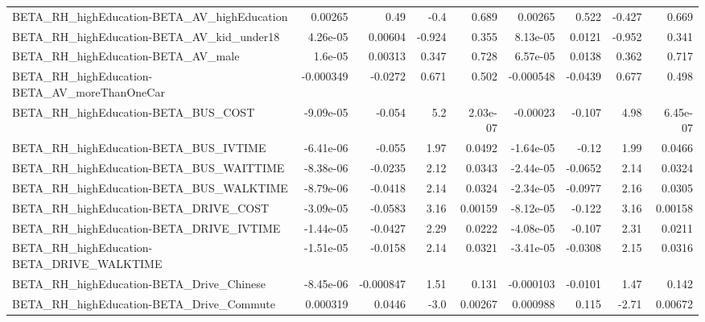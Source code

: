 \begin{tabular}{lrrrrrrrr}
BETA\_RH\_highEducation-BETA\_AV\_highEducation        &     0.00265 &         0.49 &     -0.4 &    0.689 &    0.00265 &       0.522 &       -0.427 &         0.669 \\
BETA\_RH\_highEducation-BETA\_AV\_kid\_under18          &    4.26e-05 &      0.00604 &   -0.924 &    0.355 &   8.13e-05 &      0.0121 &       -0.952 &         0.341 \\
BETA\_RH\_highEducation-BETA\_AV\_male                 &     1.6e-05 &      0.00313 &    0.347 &    0.728 &   6.57e-05 &      0.0138 &        0.362 &         0.717 \\
BETA\_RH\_highEducation-BETA\_AV\_moreThanOneCar       &   -0.000349 &      -0.0272 &    0.671 &    0.502 &  -0.000548 &     -0.0439 &        0.677 &         0.498 \\
BETA\_RH\_highEducation-BETA\_BUS\_COST                &   -9.09e-05 &       -0.054 &      5.2 & 2.03e-07 &   -0.00023 &      -0.107 &         4.98 &      6.45e-07 \\
BETA\_RH\_highEducation-BETA\_BUS\_IVTIME              &   -6.41e-06 &       -0.055 &     1.97 &   0.0492 &  -1.64e-05 &       -0.12 &         1.99 &        0.0466 \\
BETA\_RH\_highEducation-BETA\_BUS\_WAITTIME            &   -8.38e-06 &      -0.0235 &     2.12 &   0.0343 &  -2.44e-05 &     -0.0652 &         2.14 &        0.0324 \\
BETA\_RH\_highEducation-BETA\_BUS\_WALKTIME            &   -8.79e-06 &      -0.0418 &     2.14 &   0.0324 &  -2.34e-05 &     -0.0977 &         2.16 &        0.0305 \\
BETA\_RH\_highEducation-BETA\_DRIVE\_COST              &   -3.09e-05 &      -0.0583 &     3.16 &  0.00159 &  -8.12e-05 &      -0.122 &         3.16 &       0.00158 \\
BETA\_RH\_highEducation-BETA\_DRIVE\_IVTIME            &   -1.44e-05 &      -0.0427 &     2.29 &   0.0222 &  -4.08e-05 &      -0.107 &         2.31 &        0.0211 \\
BETA\_RH\_highEducation-BETA\_DRIVE\_WALKTIME          &   -1.51e-05 &      -0.0158 &     2.14 &   0.0321 &  -3.41e-05 &     -0.0308 &         2.15 &        0.0316 \\
BETA\_RH\_highEducation-BETA\_Drive\_Chinese           &   -8.45e-06 &    -0.000847 &     1.51 &    0.131 &  -0.000103 &     -0.0101 &         1.47 &         0.142 \\
BETA\_RH\_highEducation-BETA\_Drive\_Commute           &    0.000319 &       0.0446 &     -3.0 &  0.00267 &   0.000988 &       0.115 &        -2.71 &       0.00672 \\

\end{tabular}
